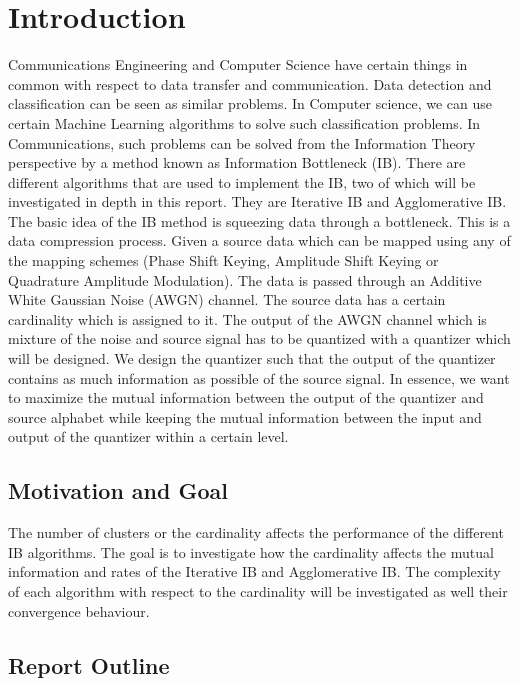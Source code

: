 \chapter{Introduction}

Communications Engineering and Computer Science have certain things in common with respect to data transfer and communication. Data detection and classification can be seen as similar problems. In Computer science, we can use certain Machine Learning algorithms to solve such classification problems. In Communications, such problems can be solved from the Information Theory perspective by a method known as Information Bottleneck (IB). There are different algorithms that are used to implement the IB, two of which will be investigated in depth in this report. They are Iterative IB and Agglomerative IB. The basic idea of the IB method is squeezing data through a bottleneck. This is a data compression process. Given a source data which can be mapped using any of the mapping schemes (Phase Shift Keying, Amplitude Shift Keying or Quadrature Amplitude Modulation). The data is passed through an Additive White Gaussian Noise (AWGN) channel. The source data has a certain cardinality which is assigned to it. The output of the AWGN channel which is mixture of the noise and source signal has to be quantized with a quantizer which will be designed. We design the quantizer such that the output of the quantizer contains as much information as possible of the source signal. In essence, we want to maximize the mutual information between the output of the quantizer and source alphabet while keeping the mutual information between the input and output of the quantizer within a certain level. 

\section{Motivation and Goal}

The number of clusters or the cardinality affects the performance of the different IB algorithms. The goal is  to investigate how the cardinality affects the mutual information and rates of the Iterative IB and Agglomerative IB. The complexity of each algorithm with respect to the cardinality will be investigated as well their convergence behaviour.

\section{Report Outline}